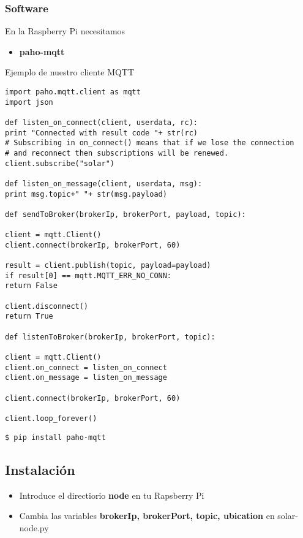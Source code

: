 \subsubsection{Software}
	En la Raspberry Pi necesitamos
	\begin{itemize}
		\item \textbf{paho-mqtt}
	\end{itemize}
	Ejemplo de nuestro cliente MQTT
\lstset{language=python}
\begin{lstlisting}[frame=single]
import paho.mqtt.client as mqtt
import json

def listen_on_connect(client, userdata, rc):
print "Connected with result code "+ str(rc)
# Subscribing in on_connect() means that if we lose the connection
# and reconnect then subscriptions will be renewed.
client.subscribe("solar")

def listen_on_message(client, userdata, msg):
print msg.topic+" "+ str(msg.payload)

def sendToBroker(brokerIp, brokerPort, payload, topic):

client = mqtt.Client()
client.connect(brokerIp, brokerPort, 60)

result = client.publish(topic, payload=payload)
if result[0] == mqtt.MQTT_ERR_NO_CONN:
return False

client.disconnect()
return True

def listenToBroker(brokerIp, brokerPort, topic):

client = mqtt.Client()
client.on_connect = listen_on_connect
client.on_message = listen_on_message

client.connect(brokerIp, brokerPort, 60)

client.loop_forever()
\end{lstlisting}

\lstset{language=bash}
\begin{lstlisting}[frame=single]
$ pip install paho-mqtt
\end{lstlisting}

\subsection{Instalación}
	\begin{itemize}
		\item Introduce el directiorio \textbf{node} en tu Rapsberry Pi
		\item Cambia las variables \textbf{brokerIp, brokerPort, topic, ubication} en solar-node.py
	\end{itemize}

